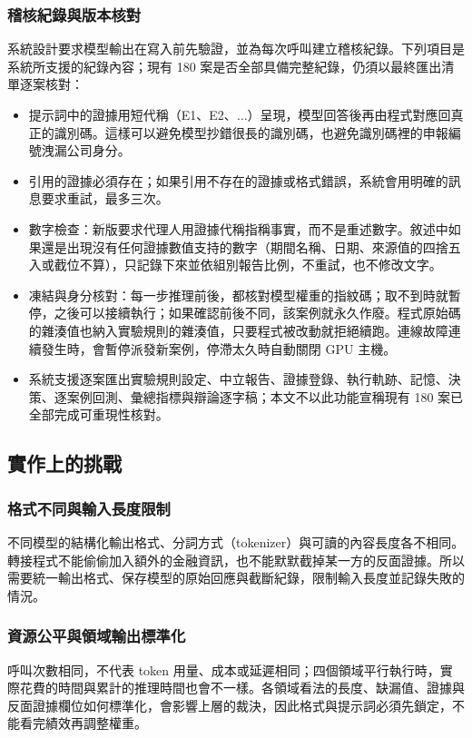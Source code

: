 \documentclass[12pt,a4paper]{article}
\numberwithin{table}{section}
\numberwithin{figure}{section}
\begin{document}
\subsubsection{稽核紀錄與版本核對}
系統設計要求模型輸出在寫入前先驗證，並為每次呼叫建立稽核紀錄。下列項目是系統所支援的紀錄內容；現有 180 案是否全部具備完整紀錄，仍須以最終匯出清單逐案核對：

\begin{itemize}
  \item 提示詞中的證據用短代稱（E1、E2、$\ldots$）呈現，模型回答後再由程式對應回真正的識別碼。這樣可以避免模型抄錯很長的識別碼，也避免識別碼裡的申報編號洩漏公司身分。
  \item 引用的證據必須存在；如果引用不存在的證據或格式錯誤，系統會用明確的訊息要求重試，最多三次。
  \item 數字檢查：新版要求代理人用證據代稱指稱事實，而不是重述數字。敘述中如果還是出現沒有任何證據數值支持的數字（期間名稱、日期、來源值的四捨五入或截位不算），只記錄下來並依組別報告比例，不重試，也不修改文字。
  \item 凍結與身分核對：每一步推理前後，都核對模型權重的指紋碼；取不到時就暫停，之後可以接續執行；如果確認前後不同，該案例就永久作廢。程式原始碼的雜湊值也納入實驗規則的雜湊值，只要程式被改動就拒絕續跑。連線故障連續發生時，會暫停派發新案例，停滯太久時自動關閉 GPU 主機。
  \item 系統支援逐案匯出實驗規則設定、中立報告、證據登錄、執行軌跡、記憶、決策、逐案例回測、彙總指標與辯論逐字稿；本文不以此功能宣稱現有 180 案已全部完成可重現性核對。
\end{itemize}
\subsection{實作上的挑戰}

\subsubsection{格式不同與輸入長度限制}
不同模型的結構化輸出格式、分詞方式（tokenizer）與可讀的內容長度各不相同。轉接程式不能偷偷加入額外的金融資訊，也不能默默截掉某一方的反面證據。所以需要統一輸出格式、保存模型的原始回應與截斷紀錄，限制輸入長度並記錄失敗的情況。

\subsubsection{資源公平與領域輸出標準化}
呼叫次數相同，不代表 token 用量、成本或延遲相同；四個領域平行執行時，實際花費的時間與累計的推理時間也會不一樣。各領域看法的長度、缺漏值、證據與反面證據欄位如何標準化，會影響上層的裁決，因此格式與提示詞必須先鎖定，不能看完績效再調整權重。
\end{document}
